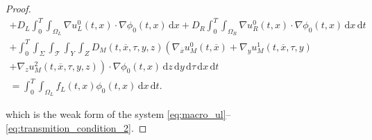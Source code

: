 \documentclass[11pt]{article}
\def\p{\partial}
\def\T{\mathcal{T}}
\newcommand{\di}[1]{\,\mathrm{d}#1}
\begin{document}
\begin{proof}
\begin{multline*}
    +D_L\int_0^T\int_{\Omega_L}\nabla u_L^0(t,x) \cdot \nabla \phi_0(t,x)   \di{x} + D_R\int_0^T\int_{\Omega_R} \nabla u_R^0(t,x)\cdot\nabla \phi_0(t,x) \di{x}\di{t}\\ 
    +  \int_0^T\int_{\Sigma}\int_\T\int_{Y}\int_Z   D_M(t,\overline{x},\tau,y,z) \left( \nabla_{\overline{x}}u_M^0(t,\overline{x})+\nabla_y u_M^1(t,\overline{x},\tau,y)\right.\\
\left.+\nabla_zu_M^2(t,\overline{x},\tau,y,z)\right)\cdot \nabla \phi_0(t,x) \di{z}\di{y}\di{\tau}\di{x}\di{t}\\
    = \int_0^T\int_{\Omega_L} f_L(t,x)\phi_0(t,x) \di{x}\di{t}.
\end{multline*}

which is the weak form of the system \eqref{eq:macro_ul}--\eqref{eq:transmition_condition_2}.








    \end{proof}
\end{document}
